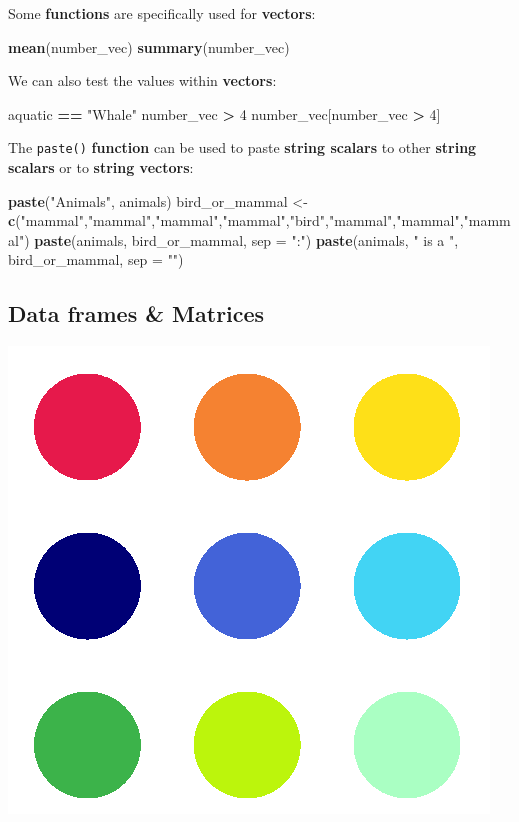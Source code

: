 \documentclass[]{book}
\newenvironment{Shaded}{\begin{snugshade}}{\end{snugshade}}
\newcommand{\KeywordTok}[1]{\textcolor[rgb]{0.13,0.29,0.53}{\textbf{#1}}}
\newcommand{\DataTypeTok}[1]{\textcolor[rgb]{0.13,0.29,0.53}{#1}}
\newcommand{\DecValTok}[1]{\textcolor[rgb]{0.00,0.00,0.81}{#1}}
\newcommand{\StringTok}[1]{\textcolor[rgb]{0.31,0.60,0.02}{#1}}
\newcommand{\OperatorTok}[1]{\textcolor[rgb]{0.81,0.36,0.00}{\textbf{#1}}}
\newcommand{\NormalTok}[1]{#1}
\begin{document}
Some \textbf{functions} are specifically used for \textbf{vectors}:

\begin{Shaded}
\begin{Highlighting}[]
\KeywordTok{mean}\NormalTok{(number_vec)}
\KeywordTok{summary}\NormalTok{(number_vec)}
\end{Highlighting}
\end{Shaded}

We can also test the values within \textbf{vectors}:

\begin{Shaded}
\begin{Highlighting}[]
\NormalTok{aquatic }\OperatorTok{==}\StringTok{ "Whale"}
\NormalTok{number_vec }\OperatorTok{>}\StringTok{ }\DecValTok{4}
\NormalTok{number_vec[number_vec }\OperatorTok{>}\StringTok{ }\DecValTok{4}\NormalTok{]}
\end{Highlighting}
\end{Shaded}

The \texttt{paste()} \textbf{function} can be used to paste
\textbf{string scalars} to other \textbf{string scalars} or to
\textbf{string vectors}:

\begin{Shaded}
\begin{Highlighting}[]
\KeywordTok{paste}\NormalTok{(}\StringTok{"Animals"}\NormalTok{, animals)}
\NormalTok{bird_or_mammal <-}\StringTok{ }\KeywordTok{c}\NormalTok{(}\StringTok{"mammal"}\NormalTok{,}\StringTok{"mammal"}\NormalTok{,}\StringTok{"mammal"}\NormalTok{,}\StringTok{"mammal"}\NormalTok{,}\StringTok{"bird"}\NormalTok{,}\StringTok{"mammal"}\NormalTok{,}\StringTok{"mammal"}\NormalTok{,}\StringTok{"mammal"}\NormalTok{)}
\KeywordTok{paste}\NormalTok{(animals, bird_or_mammal, }\DataTypeTok{sep =} \StringTok{":"}\NormalTok{)}
\KeywordTok{paste}\NormalTok{(animals, }\StringTok{" is a "}\NormalTok{, bird_or_mammal, }\DataTypeTok{sep =} \StringTok{""}\NormalTok{)}
\end{Highlighting}
\end{Shaded}

\subsection{Data frames \& Matrices}\label{data-frames-matrices}

\begin{center}\includegraphics[width=0.2\linewidth]{figures/Rmatrix} \end{center}
\end{document}
